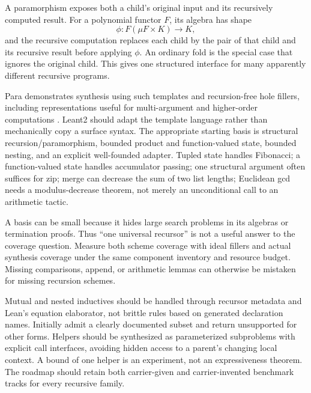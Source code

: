 
A paramorphism exposes both a child's original input and its recursively
computed result. For a polynomial functor $F$, its algebra has shape
\[
 \phi:F(\mu F\times K)\to K,
\]
and the recursive computation replaces each child by the pair of that child
and its recursive result before applying $\phi$. An ordinary fold is the
special case that ignores the original child. This gives one structured
interface for many apparently different recursive programs.

Para demonstrates synthesis using such templates and recursion-free hole
fillers, including representations useful for multi-argument and higher-order
computations \cite{para}. Leant2 should adapt the template language rather
than mechanically copy a surface syntax. The appropriate starting basis is
structural recursion/paramorphism, bounded product and function-valued state,
bounded nesting, and an explicit well-founded adapter. Tupled state handles
Fibonacci; a function-valued state handles accumulator passing; one structural
argument often suffices for zip; merge can decrease the sum of two list
lengths; Euclidean gcd needs a modulus-decrease theorem, not merely an
unconditional call to an arithmetic tactic.

A basis can be small because it hides large search problems in its algebras
or termination proofs. Thus ``one universal recursor'' is not a useful answer
to the coverage question. Measure both scheme coverage with ideal fillers and
actual synthesis coverage under the same component inventory and resource
budget. Missing comparisons, append, or arithmetic lemmas can otherwise be
mistaken for missing recursion schemes.

Mutual and nested inductives should be handled through recursor metadata and
Lean's equation elaborator, not brittle rules based on generated declaration
names. Initially admit a clearly documented subset and return unsupported for
other forms. Helpers should be synthesized as parameterized subproblems with
explicit call interfaces, avoiding hidden access to a parent's changing local
context. A bound of one helper is an experiment, not an expressiveness theorem.
The roadmap should retain both carrier-given and carrier-invented benchmark
tracks for every recursive family.
